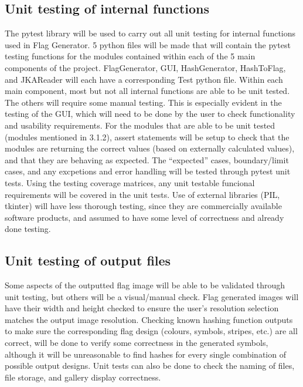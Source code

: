 \documentclass[12pt, titlepage]{article}
\begin{document}
\subsection{Unit testing of internal functions}
        The pytest library will be used to carry out all unit testing for internal functions used in Flag Generator.
        5 python files will be made that will contain the pytest testing functions for the modules contained within each of the 5 main components of the project.
        FlagGenerator, GUI, HashGenerator, HashToFlag, and JKAReader will each have a corresponding Test python file.
        Within each main component, most but not all internal functions are able to be unit tested. The others will require some manual testing. 
        This is especially evident in the testing of the GUI, which will need to be done by the user to check functionality and usability requirements.
        For the modules that are able to be unit tested (modules mentioned in 3.1.2), assert statements will be setup to check that the modules are returning the correct values (based on externally calculated values), and that they are behaving as expected.
        The ``expected'' cases, boundary/limit cases, and any excpetions and error handling will be tested through pytest unit tests. 
        Using the testing coverage matrices, any unit testable funcional requirements will be covered in the unit tests. 
		Use of external libraries (PIL, tkinter) will have less thorough testing, since they are commercially available software products, and assumed to have some level of correctness and already done testing.
\subsection{Unit testing of output files}
        Some aspects of the outputted flag image will be able to be validated through unit testing, but others will be a visual/manual check.
        Flag generated images will have their width and height checked to ensure the user's resolution selection matches the output image resolution.
        Checking known hashing function outputs to make sure the corresponding flag design (colours, symbols, stripes, etc.) are all correct, will be done to verify some correctness in the generated symbols, although it will be unreasonable to 
        find hashes for every single combination of possible output designs.
        Unit tests can also be done to check the naming of files, file storage, and gallery display correctness.



\end{document}
